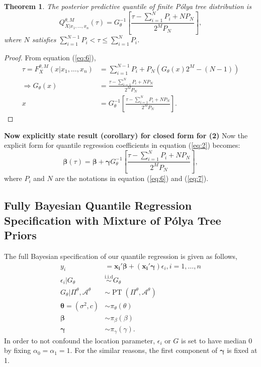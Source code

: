 \documentclass[12pt]{article}
\newtheorem{thm}{Theorem}[subsection]
\newcommand{\polya}{P\'{o}lya}
\newcommand{\iid}{\stackrel{\text{i.i.d}}{\sim}}
\DeclareMathOperator{\pt}{PT}
\begin{document}
\begin{thm}
  The posterior predictive quantile of finite \polya{} tree
  distribution is
  \begin{equation}
    \label{eq:7}
    Q^{\theta, M}_{X|x_1, \ldots, x_n}(\tau) = G^{-1}_{\theta} \left[
      \frac{\tau- \sum_{i=1}^N P_i + N P_N}{2^M P_N} \right],
  \end{equation}
  where $N$ satisfies $ \sum_{i=1}^{N-1} P_i < \tau \le \sum_{i=1}^N P_i$.
\end{thm}

\begin{proof}
  From equation (\ref{eq:6}),
  \begin{align*}
    \tau = F^{\theta,M}_X(x|x_1, \ldots, x_n) &= \sum_{i=1}^{N-1} P_{i} + P_N
    \left( G_{\theta}(x)2^M -(N-1) \right) \\
    \Rightarrow G_{\theta}(x) &= \frac{\tau - \sum_{i=1}^NP_i +
      NP_N}{2^MP_N} \\
    x & = G_{\theta}^{-1} \left[\frac{\tau - \sum_{i=1}^NP_i +
        NP_N}{2^MP_N}  \right].
  \end{align*}
\end{proof}
{\bf Now explicitly state result (corollary) for closed form for (2)}
Now the explicit form for quantile regression coefficients in equation
(\ref{eq:2}) becomes:
\begin{equation}
\label{eq:9}
  \bm{\beta}(\tau) = \bm{\beta} + \bm{\gamma}G_{\theta}^{-1}
  \left[\frac{\tau - \sum_{i=1}^NP_i +
        NP_N}{2^MP_N}  \right] ,
\end{equation}
where $P_i$ and $N$ are the notations in equation (\ref{eq:6}) and (\ref{eq:7}).

\subsection{Fully Bayesian Quantile Regression Specification with Mixture of \polya{}
  Tree Priors}
The full Bayesian specification of our quantile regression is given as
follows,
\begin{align*}
  y_i& = \bm{x_i'\beta} + (\bm{x_i'\gamma}) \epsilon_{i}, i = 1, \ldots,
  n \\
  \epsilon_i |G_{\theta} & \iid G_{\theta} \\
  G_{\theta}|\Pi^{\theta}, \mathcal{A}^{\theta} & \sim \pt
  (\Pi^{\theta}, \mathcal{A}^{\theta}) \\
  \bm{\theta} = (\sigma^2, c) & \sim \pi_{\theta}(\theta) \\
  \bm{\beta} & \sim \pi_{\beta}(\beta)\\
  \bm{\gamma} &\sim \pi_{\gamma}(\gamma).
\end{align*}
In order to not confound the location parameter, $\epsilon_i $ or $G$
is set to have median 0 by fixing $\alpha_0=\alpha_1 = 1$. For the
similar reasons,
the first component of $\bm{\gamma}$ is fixed
at 1.
\end{document}

